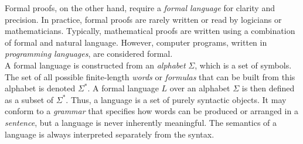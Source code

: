 Formal proofs, on the other hand, require a \textit{formal language} for clarity and precision. In practice, formal proofs are rarely written or read by logicians or mathematicians. Typically, mathematical proofs are written using a combination of formal and natural language. However, computer programs, written in \textit{programming languages}, are considered formal. \\

A formal language is constructed from an \textit{alphabet} $\Sigma$, which is a set of symbols. The set of all possible finite-length \textit{words} or \textit{formulas} that can be built from this alphabet is denoted $\Sigma^*$. A formal language $L$ over an alphabet $\Sigma$ is then defined as a subset of $\Sigma^*$. Thus, a language is a set of purely syntactic objects. It may conform to a \textit{grammar} that specifies how words can be produced or arranged in a \textit{sentence}, but a language is never inherently meaningful. The semantics of a language is always interpreted separately from the syntax.





